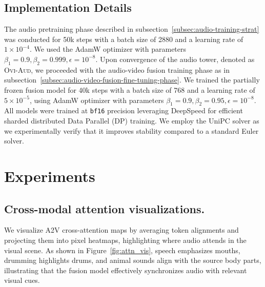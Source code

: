 \documentclass{article} %
\begin{document}
\subsection{Implementation Details}
The audio pretraining phase described in subsection~\ref{subsec:audio-training-strat} was conducted for 50k steps with a batch size of 2880 and a learning rate of $1\times10^{-4}$. We used the AdamW optimizer with parameters $\beta_{1} = 0.9, \beta_{2} = 0.999, \epsilon = 10^{-8}$. Upon convergence of the audio tower, denoted as \textsc{Ovi-Aud}, we proceeded with the audio-video fusion training phase as in subsection~\ref{subsec:audio-video-fusion-fine-tuning-phase}. We trained the partially frozen fusion model for 40k steps with a batch size of 768 and a learning rate of $5\times10^{-5}$, using AdamW optimizer with parameters $\beta_{1} = 0.9, \beta_{2} = 0.95, \epsilon = 10^{-8}$. All models were trained at \texttt{bf16} precision leveraging DeepSpeed \citep{rasley2020deepspeed} for efficient sharded distributed Data Parallel (DP) training. We employ the UniPC \citep{zhao2023unipc} solver as we experimentally verify that it improves stability compared to a standard Euler solver.

\section{Experiments}

\subsection{Cross-modal attention visualizations.} 
We visualize A2V cross-attention maps by averaging token alignments and projecting them into pixel heatmaps, highlighting where audio attends in the visual scene. As shown in Figure~\ref{fig:attn_vis}, speech emphasizes mouths, drumming highlights drums, and animal sounds align with the source body parts, illustrating that the fusion model effectively synchronizes audio with relevant visual cues.
\end{document}
